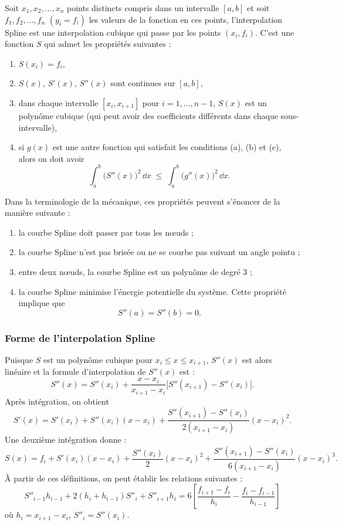 Soit $x_1, x_2, \dots, x_n$ points distincts compris dans un intervalle
$[a,b]$ et soit $f_1, f_2, \dots, f_n$ $(y_i = f_i)$ les valeurs de la fonction
en ces points, l'interpolation Spline est une interpolation cubique qui passe
par les points $(x_i, f_i)$. C'est une fonction $S$ qui admet les propriétés
suivantes :
\begin{enumerate}[label=(\alph*)]
  \item $S(x_i) = f_i$,
  \item $S(x)$, $S'(x)$, $S''(x)$ sont continues sur $[a,b]$,
  \item dans chaque intervalle $[x_i, x_{i+1}]$ pour $i = 1, \dots, n-1$,
        $S(x)$ est un polynôme cubique (qui peut avoir des coefficients
        différents dans chaque sous-intervalle),
  \item si $g(x)$ est une autre fonction qui satisfait les conditions (a), (b)
        et (c), alors on doit avoir
        \[
          \int_a^b \bigl(S''(x)\bigr)^2\,\dd x \;\le\; \int_a^b \bigl(g''(x)\bigr)^2\,\dd x .
        \]
\end{enumerate}
Dans la terminologie de la mécanique, ces propriétés peuvent s'énoncer de la
manière suivante :
\begin{enumerate}[label=(\alph*)]
  \item la courbe Spline doit passer par tous les n\oe uds ;
  \item la courbe Spline n'est pas brisée ou ne se courbe pas suivant un angle
        pointu ;
  \item entre deux n\oe uds, la courbe Spline est un polynôme de degré 3 ;
  \item la courbe Spline minimise l'énergie potentielle du système. Cette
        propriété implique que
        \[
          S''(a) = S''(b) = 0 .
        \]
\end{enumerate}

\subsubsection{Forme de l'interpolation Spline}

Puisque $S$ est un polynôme cubique pour $x_i \le x \le x_{i+1}$, $S''(x)$ est
alors linéaire et la formule d'interpolation de $S''(x)$ est :
\[
  S''(x) = S''(x_i) + \frac{x - x_i}{x_{i+1} - x_i}\bigl[S''(x_{i+1}) - S''(x_i)\bigr].
\]
Après intégration, on obtient
\[
  S'(x) = S'(x_i) + S''(x_i)(x - x_i)
        + \frac{S''(x_{i+1}) - S''(x_i)}{2(x_{i+1} - x_i)}(x - x_i)^2 .
\]
Une deuxième intégration donne :
\begin{equation}
  S(x) = f_i + S'(x_i)(x - x_i) + \frac{S''(x_i)}{2}(x - x_i)^2
       + \frac{S''(x_{i+1}) - S''(x_i)}{6(x_{i+1} - x_i)}(x - x_i)^3 .
  \tag{a}
\end{equation}
À partir de ces définitions, on peut établir les relations suivantes :
\begin{equation}
  S''_{i-1}h_{i-1} + 2(h_i + h_{i-1})S''_i + S''_{i+1}h_i
  = 6\left[\frac{f_{i+1} - f_i}{h_i} - \frac{f_i - f_{i-1}}{h_{i-1}}\right]
  \tag{b}
\end{equation}
où $h_i = x_{i+1} - x_i$, $S''_i = S''(x_i)$.


